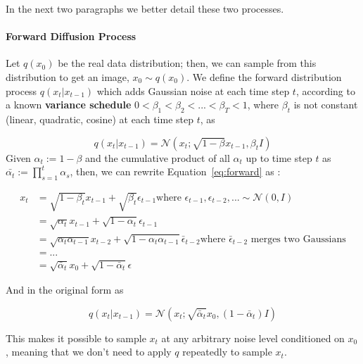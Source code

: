 \documentclass[preprint]{elsarticle}
\begin{document}
In the next two paragraphs we better detail these two processes.

\paragraph{Forward Diffusion Process} Let $q(x_0)$ be the real data distribution; then, we can sample from this distribution to get an image, $x_0 \sim q(x_0)$. 
We define the forward distribution process $q(x_t|x_{t-1})$ which adds Gaussian noise at each time step $t$, 
according to a known \textbf{variance schedule} $0<\beta_1<\beta_2<...<\beta_T<1$, where $\beta_t$ 
is not constant (linear, quadratic, cosine) at each time step $t$,  as

\begin{equation} \label{eq:forward}
	q(x_t|x_{t-1}) = \mathcal{N}(x_t; \sqrt{1-\beta}x_{t-1}, \beta_t I)
\end{equation}
Given $\alpha_t:=1-\beta$ and the cumulative product of all $\alpha_t$ up to time step $t$ as 
$\bar{\alpha_t} := \prod_{s=1}^t\alpha_s$, then, we can rewrite Equation~\ref{eq:forward} as \cite{weng2021diffusion}:

\begin{equation}
	\begin{split}
		x_t & = \sqrt{1-\beta_t}x_{t-1} + \sqrt{\beta_t}\epsilon_{t-1}
		\text{where $\epsilon_{t-1},\epsilon_{t-2},... \sim \mathcal{N}(0,I)$}\\
		& = \sqrt{\alpha_t}x_{t-1} + \sqrt{1-\alpha_t}\epsilon_{t-1} \\
		& = \sqrt{\alpha_t\alpha_{t-1}}x_{t-2} + \sqrt{1-\alpha_t\alpha_{t-1}}\bar{\epsilon}_{t-2} 
		\text{where $\bar{\epsilon}_{t-2}$ merges two Gaussians}\\
		& = ... \\
		& = \sqrt{\bar{\alpha}_t}x_0 + \sqrt{1-\bar{\alpha}_t}\epsilon 
	\end{split}
\end{equation}

And in the original form as

\begin{equation} \label{eq:forward2}
	q(x_t|x_{t-1}) = \mathcal{N}(x_t; \sqrt{\bar{\alpha}_t}x_0, (1 -\bar{\alpha}_t) I)
\end{equation}

This makes it possible to sample $x_t$ at any arbitrary noise level conditioned on $x_0$,
meaning that we don't need to apply $q$ repeatedly to sample $x_t$.
\end{document}
